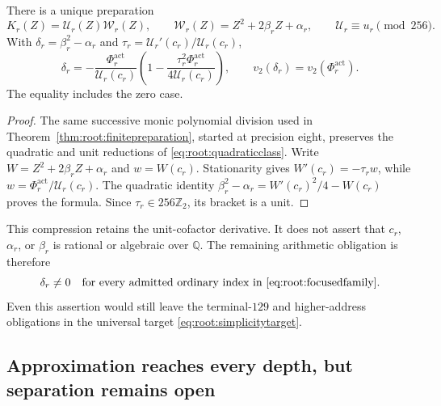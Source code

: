 \begin{proposition}
There is a unique preparation
\[
 K_r(Z)=\mathcal U_r(Z)\mathcal W_r(Z),\qquad
 \mathcal W_r(Z)=Z^2+2\beta_rZ+\alpha_r,\qquad
 \mathcal U_r\equiv u_r\pmod{256}.
\]
With $\delta_r=\beta_r^2-\alpha_r$ and
$\tau_r=\mathcal U_r'(c_r)/\mathcal U_r(c_r)$,
\begin{equation}
 \delta_r=-\frac{\Phi_r^{\mathrm{act}}}{\mathcal U_r(c_r)}
  \left(1-\frac{\tau_r^2\Phi_r^{\mathrm{act}}}{4\mathcal U_r(c_r)}\right),
 \qquad v_2(\delta_r)=v_2(\Phi_r^{\mathrm{act}}).
 \label{eq:root:discriminant}
\end{equation}
The equality includes the zero case.
\end{proposition}
\begin{proof}
The same successive monic polynomial division used in
Theorem~\ref{thm:root:finitepreparation}, started at precision eight,
preserves the quadratic and unit reductions of
\eqref{eq:root:quadraticclass}. Write
$W=Z^2+2\beta_rZ+\alpha_r$ and $w=W(c_r)$.
Stationarity gives $W'(c_r)=-\tau_rw$, while
$w=\Phi_r^{\mathrm{act}}/\mathcal U_r(c_r)$.
The quadratic identity
$\beta_r^2-\alpha_r=W'(c_r)^2/4-W(c_r)$ proves the formula.
Since $\tau_r\in256\mathbb Z_2$, its bracket is a unit.
\end{proof}

This compression retains the unit-cofactor derivative. It does not
assert that $c_r$, $\alpha_r$, or $\beta_r$ is rational or algebraic
over $\mathbb Q$. The remaining arithmetic obligation is therefore
\begin{equation}
 \delta_r\ne0\quad\text{for every admitted ordinary index in
 \eqref{eq:root:focusedfamily}.}
 \label{eq:root:remaining}
\end{equation}
Even this assertion would still leave the terminal-$129$ and higher-address
obligations in the universal target \eqref{eq:root:simplicitytarget}.

\subsection{Approximation reaches every depth, but separation remains open}
\label{app:root:approximation}

